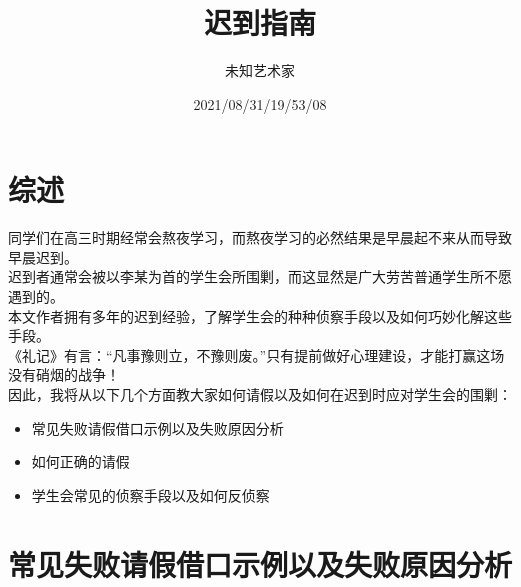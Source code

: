 \documentclass[UTF8]{ctexart}
\title{迟到指南}
\author{未知艺术家}
\date{2021/08/31/19/53/08}
\begin{document}
	\maketitle
	\tableofcontents
	\section{综述}
同学们在高三时期经常会熬夜学习，而熬夜学习的必然结果是早晨起不来从而导致早晨迟到。\\
迟到者通常会被以李某为首的学生会所围剿，而这显然是广大劳苦普通学生所不愿遇到的。\\
本文作者拥有多年的迟到经验，了解学生会的种种侦察手段以及如何巧妙化解这些手段。\\
《礼记》有言：“凡事豫则立，不豫则废。”只有提前做好心理建设，才能打赢这场没有硝烟的战争！\\
因此，我将从以下几个方面教大家如何请假以及如何在迟到时应对学生会的围剿：\\
\begin{itemize}
	\item 常见失败请假借口示例以及失败原因分析
	\item 如何正确的请假
	\item 学生会常见的侦察手段以及如何反侦察
\end{itemize}

\maketitle
	\section{常见失败请假借口示例以及失败原因分析}
\end{document}
